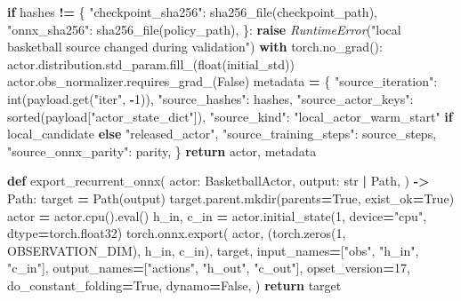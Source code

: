 \documentclass[
  american,
  11pt,
  letterpaper,
]{article}
\newenvironment{Shaded}{\begin{snugshade}}{\end{snugshade}}
\newcommand{\BuiltInTok}[1]{#1}
\newcommand{\ControlFlowTok}[1]{\textcolor[rgb]{0.13,0.29,0.53}{\textbf{#1}}}
\newcommand{\DecValTok}[1]{\textcolor[rgb]{0.00,0.00,0.81}{#1}}
\newcommand{\KeywordTok}[1]{\textcolor[rgb]{0.13,0.29,0.53}{\textbf{#1}}}
\newcommand{\NormalTok}[1]{#1}
\newcommand{\OperatorTok}[1]{\textcolor[rgb]{0.81,0.36,0.00}{\textbf{#1}}}
\newcommand{\PreprocessorTok}[1]{\textcolor[rgb]{0.56,0.35,0.01}{\textit{#1}}}
\newcommand{\StringTok}[1]{\textcolor[rgb]{0.31,0.60,0.02}{#1}}
\newcommand{\VariableTok}[1]{\textcolor[rgb]{0.00,0.00,0.00}{#1}}
\renewenvironment{Shaded}{\par\smallskip}{\par\smallskip}
\begin{document}
\begin{Shaded}
\begin{Highlighting}[]
        \ControlFlowTok{if}\NormalTok{ hashes }\OperatorTok{!=}\NormalTok{ \{}
            \StringTok{"checkpoint\_sha256"}\NormalTok{: sha256\_file(checkpoint\_path),}
            \StringTok{"onnx\_sha256"}\NormalTok{: sha256\_file(policy\_path),}
\NormalTok{        \}:}
            \ControlFlowTok{raise} \PreprocessorTok{RuntimeError}\NormalTok{(}\StringTok{"local basketball source changed during validation"}\NormalTok{)}
    \ControlFlowTok{with}\NormalTok{ torch.no\_grad():}
\NormalTok{        actor.distribution.std\_param.fill\_(}\BuiltInTok{float}\NormalTok{(initial\_std))}
\NormalTok{    actor.obs\_normalizer.requires\_grad\_(}\VariableTok{False}\NormalTok{)}
\NormalTok{    metadata }\OperatorTok{=}\NormalTok{ \{}
        \StringTok{"source\_iteration"}\NormalTok{: }\BuiltInTok{int}\NormalTok{(payload.get(}\StringTok{"iter"}\NormalTok{, }\OperatorTok{{-}}\DecValTok{1}\NormalTok{)),}
        \StringTok{"source\_hashes"}\NormalTok{: hashes,}
        \StringTok{"source\_actor\_keys"}\NormalTok{: }\BuiltInTok{sorted}\NormalTok{(payload[}\StringTok{"actor\_state\_dict"}\NormalTok{]),}
        \StringTok{"source\_kind"}\NormalTok{: }\StringTok{"local\_actor\_warm\_start"} \ControlFlowTok{if}\NormalTok{ local\_candidate }\ControlFlowTok{else} \StringTok{"released\_actor"}\NormalTok{,}
        \StringTok{"source\_training\_steps"}\NormalTok{: source\_steps,}
        \StringTok{"source\_onnx\_parity"}\NormalTok{: parity,}
\NormalTok{    \}}
    \ControlFlowTok{return}\NormalTok{ actor, metadata}


\KeywordTok{def}\NormalTok{ export\_recurrent\_onnx(}
\NormalTok{    actor: BasketballActor,}
\NormalTok{    output: }\BuiltInTok{str} \OperatorTok{|}\NormalTok{ Path,}
\NormalTok{) }\OperatorTok{{-}\textgreater{}}\NormalTok{ Path:}
\NormalTok{    target }\OperatorTok{=}\NormalTok{ Path(output)}
\NormalTok{    target.parent.mkdir(parents}\OperatorTok{=}\VariableTok{True}\NormalTok{, exist\_ok}\OperatorTok{=}\VariableTok{True}\NormalTok{)}
\NormalTok{    actor }\OperatorTok{=}\NormalTok{ actor.cpu().}\BuiltInTok{eval}\NormalTok{()}
\NormalTok{    h\_in, c\_in }\OperatorTok{=}\NormalTok{ actor.initial\_state(}\DecValTok{1}\NormalTok{, device}\OperatorTok{=}\StringTok{"cpu"}\NormalTok{, dtype}\OperatorTok{=}\NormalTok{torch.float32)}
\NormalTok{    torch.onnx.export(}
\NormalTok{        actor,}
\NormalTok{        (torch.zeros(}\DecValTok{1}\NormalTok{, OBSERVATION\_DIM), h\_in, c\_in),}
\NormalTok{        target,}
\NormalTok{        input\_names}\OperatorTok{=}\NormalTok{[}\StringTok{"obs"}\NormalTok{, }\StringTok{"h\_in"}\NormalTok{, }\StringTok{"c\_in"}\NormalTok{],}
\NormalTok{        output\_names}\OperatorTok{=}\NormalTok{[}\StringTok{"actions"}\NormalTok{, }\StringTok{"h\_out"}\NormalTok{, }\StringTok{"c\_out"}\NormalTok{],}
\NormalTok{        opset\_version}\OperatorTok{=}\DecValTok{17}\NormalTok{,}
\NormalTok{        do\_constant\_folding}\OperatorTok{=}\VariableTok{True}\NormalTok{,}
\NormalTok{        dynamo}\OperatorTok{=}\VariableTok{False}\NormalTok{,}
\NormalTok{    )}
    \ControlFlowTok{return}\NormalTok{ target}



\end{Highlighting}
\end{Shaded}
\end{document}

